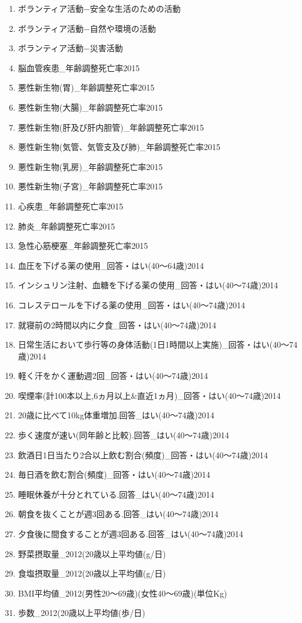 \begin{enumerate}
  \item ボランティア活動−安全な生活のための活動
  \item ボランティア活動−自然や環境の活動
  \item ボランティア活動−災害活動
  \item 脳血管疾患\_年齢調整死亡率2015
  \item 悪性新生物(胃)\_年齢調整死亡率2015
  \item 悪性新生物(大腸)\_年齢調整死亡率2015
  \item 悪性新生物(肝及び肝内胆管)\_年齢調整死亡率2015
  \item 悪性新生物(気管、気管支及び肺)\_年齢調整死亡率2015
  \item 悪性新生物(乳房)\_年齢調整死亡率2015
  \item 悪性新生物(子宮)\_年齢調整死亡率2015
  \item 心疾患\_年齢調整死亡率2015
  \item 肺炎\_年齢調整死亡率2015
  \item 急性心筋梗塞\_年齢調整死亡率2015
  \item 血圧を下げる薬の使用\_回答・はい(40〜64歳)2014
  \item インシュリン注射、血糖を下げる薬の使用\_回答・はい(40〜74歳)2014
  \item コレステロールを下げる薬の使用\_回答・はい(40〜74歳)2014
  \item 就寝前の2時間以内に夕食\_回答・はい(40〜74歳)2014
  \item 日常生活において歩行等の身体活動(1日1時間以上実施)\_回答・はい(40〜74歳)2014
  \item 軽く汗をかく運動週2回\_回答・はい(40〜74歳)2014
  \item 喫煙率(計100本以上,6ヵ月以上\&直近1ヵ月)\_回答・はい(40〜74歳)2014
  \item 20歳に比べて10kg体重増加.回答\_はい(40〜74歳)2014
  \item 歩く速度が速い(同年齢と比較).回答\_はい(40〜74歳)2014
  \item 飲酒日1日当たり2合以上飲む割合(頻度)\_回答・はい(40〜74歳)2014
  \item 毎日酒を飲む割合(頻度)\_回答・はい(40〜74歳)2014
  \item 睡眠休養が十分とれている.回答\_はい(40〜74歳)2014
  \item 朝食を抜くことが週3回ある.回答\_はい(40〜74歳)2014
  \item 夕食後に間食することが週3回ある.回答\_はい(40〜74歳)2014
  \item 野菜摂取量\_2012(20歳以上平均値(g/日)
  \item 食塩摂取量\_2012(20歳以上平均値(g/日)
  \item BMI平均値\_2012(男性20〜69歳)(女性40〜69歳)(単位Kg)
  \item 歩数\_2012(20歳以上平均値(歩/日)
\end{enumerate}


